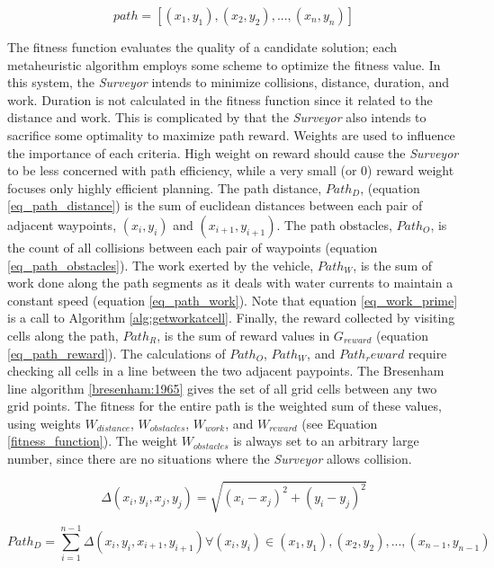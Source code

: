 \documentclass{tamuccthesis}
\begin{document}
\begin{equation}
path = [ (x_{1}, y_{1}), (x_{2}, y_{2}), ..., (x_{n}, y_{n}) ]
\label{solution_path}
\end{equation}

The fitness function evaluates the quality of a candidate solution; each metaheuristic algorithm employs some scheme to optimize the fitness value. In this system, the \textit{Surveyor} intends to minimize collisions, distance, duration, and work. Duration is not calculated in the fitness function since it related to the distance and work. This is complicated by that the \textit{Surveyor} also intends to sacrifice some optimality to maximize path reward. Weights are used to influence the importance of each criteria. High weight on reward should cause the \textit{Surveyor} to be less concerned with path efficiency, while a very small (or 0) reward weight focuses only highly efficient planning. The path distance, $Path_D$, (equation \ref{eq_path_distance}) is the sum of euclidean distances between each pair of adjacent waypoints, $(x_{i}, y_{i})$ and $(x_{i+1}, y_{i+1})$. The path obstacles, $Path_O$, is the count of all collisions between each pair of waypoints (equation \ref{eq_path_obstacles}). The work exerted by the vehicle, $Path_W$, is the sum of work done along the path segments as it deals with water currents to maintain a constant speed (equation \ref{eq_path_work}). Note that equation \ref{eq_work_prime} is a call to Algorithm \ref{alg:getworkatcell}. Finally, the reward collected by visiting cells along the path, $Path_R$, is the sum of reward values in $G_{reward}$ (equation \ref{eq_path_reward}). The calculations of $Path_O$, $Path_W$, and $Path_reward$ require checking all cells in a line between the two adjacent paypoints. The Bresenham line algorithm \ref{bresenham:1965} gives the set of all grid cells between any two grid points. The fitness for the entire path is the weighted sum of these values, using weights $W_{distance}$, $W_{obstacles}$, $W_{work}$, and $W_{reward}$ (see Equation \ref{fitness_function}). The weight $W_{obstacles}$ is always set to an arbitrary large number, since there are no situations where the \textit{Surveyor} allows collision. 

\begin{equation}
\Delta (x_{i}, y_{i}, x_{j}, y_{j}) = \sqrt{(x_{i} - x_{j})^2 + (y_{i} - y_{j})^2}
\label{eq_distance}
\end{equation}

\begin{equation}
Path_{D} = \sum_{i=1}^{n-1} \Delta (x_{i}, y_{i}, x_{i+1}, y_{i+1}) \forall (x_{i}, y_{i}) \in (x_{1}, y_{1}), (x_{2}, y_{2}), ..., (x_{n-1}, y_{n-1})
\label{eq_path_distance}
\end{equation}
\end{document}
